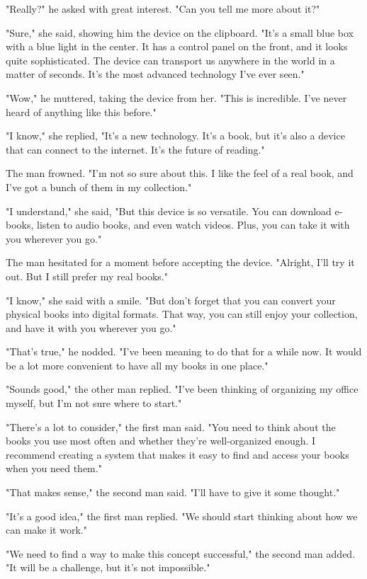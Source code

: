 \documentclass[smalldemyvopaper,11pt,twoside,onecolumn,openright,extrafontsizes]{memoir}
\begin{document}
"Really?" he asked with great interest. "Can you tell me more about it?"\par
"Sure," she said, showing him the device on the clipboard. "It's a small blue box with a blue light in the center. It has a control panel on the front, and it looks quite sophisticated. The device can transport us anywhere in the world in a matter of seconds. It's the most advanced technology I've ever seen."\par
"Wow," he muttered, taking the device from her. "This is incredible. I've never heard of anything like this before."\par
"I know," she replied, "It's a new technology. It's a book, but it's also a device that can connect to the internet. It's the future of reading."\par
The man frowned. "I'm not so sure about this. I like the feel of a real book, and I've got a bunch of them in my collection."\par
"I understand," she said, "But this device is so versatile. You can download e-books, listen to audio books, and even watch videos. Plus, you can take it with you wherever you go."\par
The man hesitated for a moment before accepting the device. "Alright, I'll try it out. But I still prefer my real books."\par
"I know," she said with a smile. "But don't forget that you can convert your physical books into digital formats. That way, you can still enjoy your collection, and have it with you wherever you go."\par
"That's true," he nodded. "I've been meaning to do that for a while now. It would be a lot more convenient to have all my books in one place."\par
"Sounds good," the other man replied. "I've been thinking of organizing my office myself, but I'm not sure where to start."\par
"There's a lot to consider," the first man said. "You need to think about the books you use most often and whether they're well-organized enough. I recommend creating a system that makes it easy to find and access your books when you need them."\par
"That makes sense," the second man said. "I'll have to give it some thought."\par
"It's a good idea," the first man replied. "We should start thinking about how we can make it work."\par
"We need to find a way to make this concept successful," the second man added. "It will be a challenge, but it's not impossible."\par
\end{document}
